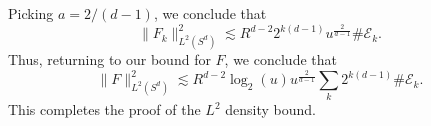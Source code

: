 \documentclass[dvipsnames,letterpaper,12pt]{article}
\begin{document}
%
Picking $a = 2 / (d-1)$, we conclude that
%
\[ \| F_k \|_{L^2(S^d)}^2 \lesssim R^{d-2} 2^{k(d-1)} u^{\frac{2}{d-1}} \# \mathcal{E}_k. \]
%
Thus, returning to our bound for $F$, we conclude that
%
\[ \| F \|_{L^2(S^d)}^2 \lesssim R^{d-2} \log_2(u) u^{\frac{2}{d-1}} \sum_k  2^{k(d-1)} \# \mathcal{E}_k. \]  
%
This completes the proof of the $L^2$ density bound.



\end{document}
